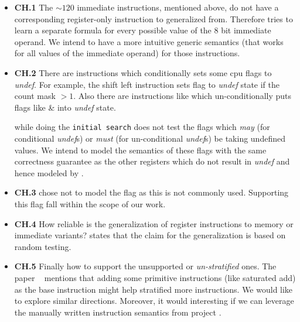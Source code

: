 \begin{itemize}
           
    \item 
    \textbf{CH.1} The $\sim120$ immediate instructions, mentioned above, 
    do not have a corresponding register-only instruction to generalized from. 
    Therefore \Strata tries to learn a separate formula
    for every possible value of the 8 bit immediate operand.
    We intend to have a more intuitive generic semantics (that works for all values of the immediate operand) for those instructions. 

 \item \textbf{CH.2} There are instructions which conditionally sets some
cpu flags to \emph{undef}. For example, the shift left instruction
 sets flag  to \emph{undef} state if the
count mask $>1$.  Also there are instructions like  which un-conditionally puts flags like  \&  into
\emph{undef} state.
    
    \Strata while doing the {\tt initial search} does not test the flags which
\emph{may} (for conditional \emph{undef}s)  or \emph{must} (for
un-conditional \emph{undef}s) be taking undefined values. We intend to
model the semantics of these flags with the same correctness guarantee as
the other registers which do not result in \emph{undef} and hence modeled by \Strata.

    \item \textbf{CH.3} \Strata chose not to model the  flag as this is not commonly used. Supporting this flag fall within the scope of our work.
      
    \item \textbf{CH.4} How reliable is the generalization of register
    instructions to memory or immediate variants? \Strata states that the claim
    for the generalization is based on random testing.
    
    \item \textbf{CH.5} Finally how to support the unsupported or
    \emph{un-stratified} ones. The paper ~\cite{Heule2016a} mentions that adding
    some primitive instructions (like saturated add) as the base instruction
    might help stratified more instructions. We would like to explore similar
    directions. Moreover, it would interesting if we can leverage the manually written instruction semantics from project \Stoke.      

\end{itemize} 

